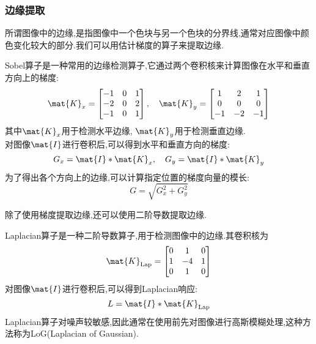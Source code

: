 \documentclass{ctexart}
\begin{document}
\subsubsection{边缘提取}
所谓图像中的边缘,是指图像中一个色块与另一个色块的分界线,通常对应图像中颜色变化较大的部分.我们可以用估计梯度的算子来提取边缘.
\begin{definition}[Sobel算子]
    Sobel算子是一种常用的边缘检测算子,它通过两个卷积核来计算图像在水平和垂直方向上的梯度:
    \[
        \mat{K}_x = \begin{bmatrix}
            -1 & 0 & 1 \\
            -2 & 0 & 2 \\
            -1 & 0 & 1
        \end{bmatrix},\quad
        \mat{K}_y = \begin{bmatrix}
            1 & 2 & 1 \\
            0 & 0 & 0 \\
            -1 & -2 & -1
        \end{bmatrix}
    \]
    其中$\mat{K}_x$用于检测水平边缘, $\mat{K}_y$用于检测垂直边缘.\\
    对图像$\mat{I}$进行卷积后,可以得到水平和垂直方向的梯度:
    \[
        G_x = \mat{I} * \mat{K}_x,\quad G_y = \mat{I} * \mat{K}_y
    \]
    为了得出各个方向上的边缘,可以计算指定位置的梯度向量的模长:
    \[
        G = \sqrt{G_x^2 + G_y^2}
    \]
\end{definition}
除了使用梯度提取边缘,还可以使用二阶导数提取边缘.
\begin{definition}[Laplacian算子]
    Laplacian算子是一种二阶导数算子,用于检测图像中的边缘.其卷积核为
    \[
        \mat{K}_{\text{Lap}} = \begin{bmatrix}
            0 & 1 & 0 \\
            1 & -4 & 1 \\
            0 & 1 & 0
        \end{bmatrix}
    \]
    对图像$\mat{I}$进行卷积后,可以得到Laplacian响应:
    \[L = \mat{I} * \mat{K}_{\text{Lap}}\]
    Laplacian算子对噪声较敏感,因此通常在使用前先对图像进行高斯模糊处理,这种方法称为LoG(Laplacian of Gaussian).
\end{definition}
\end{document}
